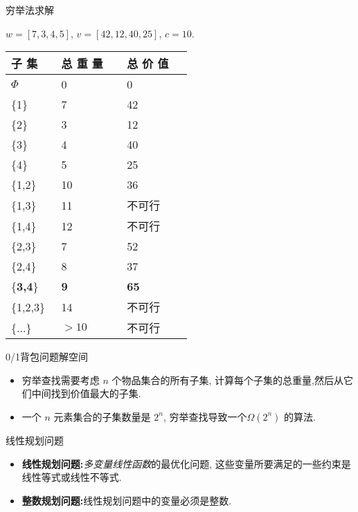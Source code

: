\documentclass[fontset=fandol,UTF8,fleqn]{beamer}
\begin{document}
\begin{frame}{穷举法求解}
\begin{table}[centering]
  \centering
$w=[7,3,4,5]$, $v=[42,12,40,25]$, $c=10$.
\footnotesize{
  \begin{tabular}{l|l|l}
    \hline
\qquad 子 集\ \qquad\ & \qquad 总 重 量\ \qquad\ & \qquad 总 价 值\ \qquad\ \\
\hline
$\Phi$ & 0 & 0 \\
\hline
\{1\} & 7 & 42 \\
\hline
\{2\} & 3 & 12 \\
\hline
\{3\} & 4 & 40 \\
\hline
\{4\} & 5 & 25 \\
\hline
\{1,2\} & 10 & 36 \\
\hline
\{1,3\} & 11 & 不可行 \\
\hline
\{1,4\} & 12 & 不可行 \\
\hline
\{2,3\} & 7 & 52 \\
\hline
\{2,4\} & 8 & 37 \\
\hline
\{\textbf{3,4}\} & \textbf{9} & \textbf{65} \\
\hline
\{1,2,3\} & 14 & 不可行 \\
\hline
\{$\ldots$\} & $>10$ & 不可行 \\
\hline
  \end{tabular}
}
\end{table}
\end{frame}

\begin{frame}{0/1背包问题解空间}
  \begin{itemize}[<+-|alert@+>]
\item 穷举查找需要考虑 $n$ 个物品集合的所有子集, 计算每个子集的总重量,然后从它们中间找到价值最大的子集.  
\item 一个 $n$ 元素集合的子集数量是 $2^n$, 穷举查找导致一个$\Omega(2^n)$ 的算法. 
\end{itemize}
\end{frame}

\begin{frame}{线性规划问题}
\begin{itemize}[<+-|alert@+>]
\item \textbf{线性规划问题:}\emph{多变量线性函数}的最优化问题, 这些变量所要满足的一些约束是线性等式或线性不等式. 
\item \textbf{整数规划问题:}线性规划问题中的变量必须是整数.  
\end{itemize}
\end{frame}
\end{document}
